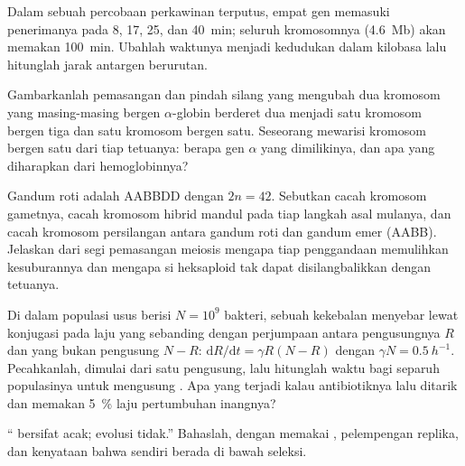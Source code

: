 \begin{exercise}[$\star\star$]\label{exo:b2:genome-diversification:8}
Dalam sebuah percobaan perkawinan terputus, empat gen memasuki
penerimanya pada 8, 17, 25, dan \qty{40}{min}; seluruh kromosomnya
(\qty{4.6}{Mb}) akan memakan \qty{100}{min}. Ubahlah waktunya menjadi
kedudukan dalam kilobasa lalu hitunglah jarak antargen berurutan.
\end{exercise}

\begin{exercise}[$\star\star$]\label{exo:b2:genome-diversification:9}
Gambarkanlah pemasangan dan pindah silang yang mengubah dua kromosom
yang masing-masing bergen $\alpha$-globin berderet dua menjadi satu
kromosom bergen tiga dan satu kromosom bergen satu. Seseorang mewarisi
kromosom bergen satu dari tiap tetuanya: berapa gen $\alpha$ yang
dimilikinya, dan apa yang diharapkan dari hemoglobinnya?
\end{exercise}

\begin{exercise}[$\star\star\star$]\label{exo:b2:genome-diversification:10}
Gandum roti adalah AABBDD dengan $2n = 42$. Sebutkan cacah kromosom
gametnya, cacah kromosom hibrid mandul pada tiap langkah asal mulanya,
dan cacah kromosom persilangan antara gandum roti dan gandum emer
(AABB). Jelaskan dari segi pemasangan meiosis mengapa tiap penggandaan
memulihkan kesuburannya dan mengapa si heksaploid tak dapat
disilangbalikkan dengan tetuanya.
\end{exercise}

\begin{exercise}[$\star\star\star$]\label{exo:b2:genome-diversification:11}
Di dalam populasi usus berisi $N = 10^{9}$ bakteri, sebuah 
kekebalan menyebar lewat konjugasi pada laju yang sebanding dengan
perjumpaan antara pengusungnya $R$ dan yang bukan pengusung $N - R$:
$\mathrm{d}R/\mathrm{d}t =
\gamma R (N - R)$ dengan $\gamma N = \qty{0.5}{h^{-1}}$. Pecahkanlah,
dimulai dari satu pengusung, lalu hitunglah waktu bagi separuh
populasinya untuk mengusung . Apa yang terjadi kalau
antibiotiknya lalu ditarik dan  memakan \qty{5}{\%} laju
pertumbuhan inangnya?
\end{exercise}

\begin{exercise}[$\star\star\star$]\label{exo:b2:genome-diversification:12}
`` bersifat acak; evolusi tidak.'' Bahaslah, dengan memakai
, pelempengan replika, dan kenyataan bahwa  sendiri berada di bawah seleksi.
\end{exercise}

